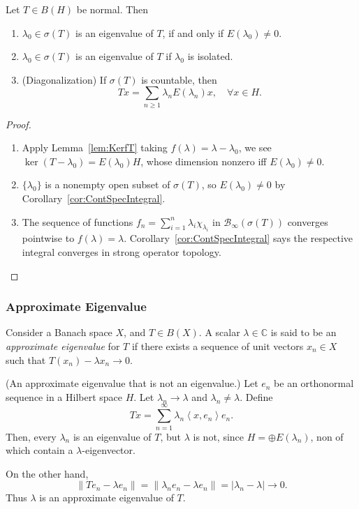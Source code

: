 \begin{proposition}
	\label{prop:SpectrumNormalOperator}
	Let $T \in B(H)$ be normal. Then
	\begin{enumerate}
		\item $\lambda_0 \in \sigma(T)$ is an eigenvalue of $T$, if and only if $E(\lambda_0) \neq 0$.
		\item $\lambda_0 \in \sigma(T)$ is an eigenvalue of $T$ if $\lambda_0$ is isolated.
		\item (Diagonalization) If $\sigma(T)$ is countable, then
			\[
				T x = \sum_{n \ge 1} \lambda_n E(\lambda_n) x, \quad  \forall x \in H
			.\] 
	\end{enumerate}
\end{proposition}
\begin{proof}
	\begin{enumerate}
		\item Apply Lemma~\ref{lem:KerfT} taking $f(\lambda) = \lambda - \lambda_0$, we see $\operatorname{ker} (T - \lambda_0) = E(\lambda_0) H$, whose dimension nonzero iff $E(\lambda_0)\neq 0$.
		\item $\{\lambda_0\} $ is a nonempty open subset of $\sigma(T)$, so $E(\lambda_0) \neq 0$ by Corollary~\ref{cor:ContSpecIntegral}.
		\item The sequence of functions $f_n = \sum_{i = 1}^n \lambda_i \chi_{\lambda_i}$ in $\mathcal{B}_{\infty }(\sigma(T))$ converges pointwise to $f(\lambda) = \lambda$. Corollary~\ref{cor:ContSpecIntegral} says the respective integral converges in strong operator topology.
	\end{enumerate}
\end{proof}

\subsubsection{Approximate Eigenvalue}

\begin{definition}
	\label{defn:ApproximateEigenvalue}
	
	Consider a Banach space $X$, and $T \in B(X)$. A scalar $\lambda \in \mathbb{C}$ is said to be an \textit{approximate eigenvalue} for $T$ if there exists a sequence of unit vectors $x_n \in X$ such that $T(x_n) - \lambda x_n \to 0$.
\end{definition}

\begin{example}
	(An approximate eigenvalue that is not an eigenvalue.) 
	Let $e_n$ be an orthonormal sequence in a Hilbert space $H$. Let $\lambda_n \to \lambda$ and $\lambda_n \neq \lambda$. Define 
	\[
		T x = \sum_{n = 1}^\infty  \lambda_n \left\langle x, e_n \right\rangle e_n
	.\] 
	Then, every $\lambda_n$ is an eigenvalue of $T$, but $\lambda$ is not, since $H = \oplus E(\lambda_n)$, non of which contain a $\lambda$-eigenvector.

	On the other hand,
	\[
		\|T e_n - \lambda e_n\|= \|\lambda_n e_n - \lambda e_n\| = |\lambda_n - \lambda| \to 0
	.\] 
	Thus $\lambda$ is an approximate eigenvalue of $T$.
\end{example}

